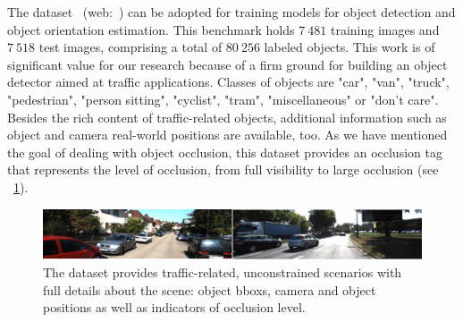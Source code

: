 The  dataset~\cite{geiger2012cvpr} (web:~\cite{webkittiobjdetectiondataset}) can be adopted for training models for object detection and object orientation estimation. This benchmark holds $7\ 481$ training images and $7\ 518$ test images, comprising a total of $80\ 256$ labeled objects. This work is of significant value for our research because of a firm ground for building an object detector aimed at traffic applications. Classes of objects are "car", "van", "truck", "pedestrian", "person sitting", "cyclist", "tram", "miscellaneous" or "don't care". Besides the rich content of traffic-related objects, additional information such as object and camera real-world positions are available, too. As we have mentioned the goal of dealing with object occlusion, this dataset provides an occlusion tag that represents the level of occlusion, from full visibility to large occlusion (see \figstr{}~\ref{fig:KITTIDetectionDataset}).

\begin{figure}[t]
    \centerline{\includegraphics[width=0.9\linewidth]{figures/datasets/kitti_detection_sample.pdf}}
    \caption[ dataset]{The  dataset provides traffic-related, unconstrained scenarios with full details about the scene: object \glspl{bbox}, camera and object positions as well as indicators of occlusion level. }
    \label{fig:KITTIDetectionDataset}
\end{figure}
